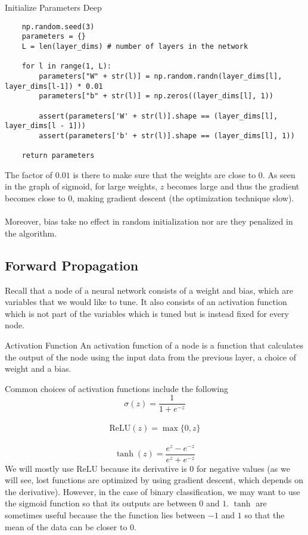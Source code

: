 \documentclass[a4paper]{article}
\begin{document}
\begin{enumerate}
\begin{alg}{Initialize Parameters Deep}{}
\begin{verbatim}
    np.random.seed(3)
    parameters = {}
    L = len(layer_dims) # number of layers in the network

    for l in range(1, L):
        parameters["W" + str(l)] = np.random.randn(layer_dims[l], layer_dims[l-1]) * 0.01
        parameters["b" + str(l)] = np.zeros((layer_dims[l], 1))
        
        assert(parameters['W' + str(l)].shape == (layer_dims[l], layer_dims[l - 1]))
        assert(parameters['b' + str(l)].shape == (layer_dims[l], 1))
        
    return parameters
\end{verbatim}
\end{alg}

The factor of $0.01$ is there to make sure that the weights are close to $0$. As seen in the graph of sigmoid, for large weights, $z$ becomes large and thus the gradient becomes close to $0$, making gradient descent (the optimization technique slow). \\~\\
Moreover, bias take no effect in random initialization nor are they penalized in the algorithm. 

\subsection{Forward Propagation}
Recall that a node of a neural network consists of a weight and bias, which are variables that we would like to tune. It also consists of an activation function which is not part of the variables which is tuned but is instead fixed for every node. 

\begin{defn}{Activation Function}{} An activation function of a node is a function that calculates the output of the node using the input data from the previous layer, a choice of weight and a bias. 
\end{defn}

Common choices of activation functions include the following $$\sigma(z)=\frac{1}{1+e^{-z}}$$~$$\text{ReLU}(z)=\max\{0,z\}$$~$$\tanh(z)=\frac{e^z-e^{-z}}{e^z+e^{-z}}$$ We will mostly use $\text{ReLU}$ because its derivative is $0$ for negative values (as we will see, lost functions are optimized by using gradient descent, which depends on the derivative). However, in the case of binary classification, we may want to use the sigmoid function so that its outputs are between $0$ and $1$. $\tanh$ are sometimes useful because the the function lies between $-1$ and $1$ so that the mean of the data can be closer to $0$. \\~\\


\end{enumerate}
\end{document}
